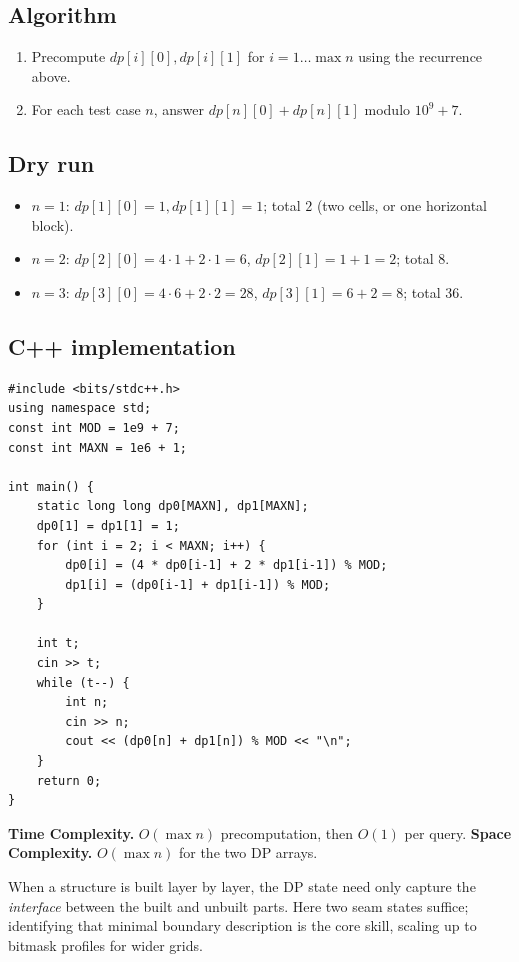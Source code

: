 \subsection*{Algorithm}

\begin{enumerate}
  \item Precompute $\textit{dp}[i][0],\textit{dp}[i][1]$ for
        $i=1\ldots\max n$ using the recurrence above.
  \item For each test case $n$, answer
        $\textit{dp}[n][0]+\textit{dp}[n][1]$ modulo $10^9+7$.
\end{enumerate}

\subsection*{Dry run}


\begin{itemize}
  \item $n=1$: $\textit{dp}[1][0]=1,\textit{dp}[1][1]=1$; total $2$
        (two cells, or one horizontal block).
  \item $n=2$: $\textit{dp}[2][0]=4\cdot1+2\cdot1=6$,
        $\textit{dp}[2][1]=1+1=2$; total $8$.
  \item $n=3$: $\textit{dp}[3][0]=4\cdot6+2\cdot2=28$,
        $\textit{dp}[3][1]=6+2=8$; total $36$.
\end{itemize}

\subsection*{C++ implementation}

\begin{lstlisting}
#include <bits/stdc++.h>
using namespace std;
const int MOD = 1e9 + 7;
const int MAXN = 1e6 + 1;

int main() {
    static long long dp0[MAXN], dp1[MAXN];
    dp0[1] = dp1[1] = 1;
    for (int i = 2; i < MAXN; i++) {
        dp0[i] = (4 * dp0[i-1] + 2 * dp1[i-1]) % MOD;
        dp1[i] = (dp0[i-1] + dp1[i-1]) % MOD;
    }

    int t;
    cin >> t;
    while (t--) {
        int n;
        cin >> n;
        cout << (dp0[n] + dp1[n]) % MOD << "\n";
    }
    return 0;
}
\end{lstlisting}

\begin{complexitybox}
\textbf{Time Complexity.} $O(\max n)$ precomputation, then $O(1)$ per
query. \textbf{Space Complexity.} $O(\max n)$ for the two DP arrays.
\end{complexitybox}

\begin{takeawaybox}
When a structure is built layer by layer, the DP state need only capture
the \emph{interface} between the built and unbuilt parts. Here two seam
states suffice; identifying that minimal boundary description is the core
skill, scaling up to bitmask profiles for wider grids.
\end{takeawaybox}
